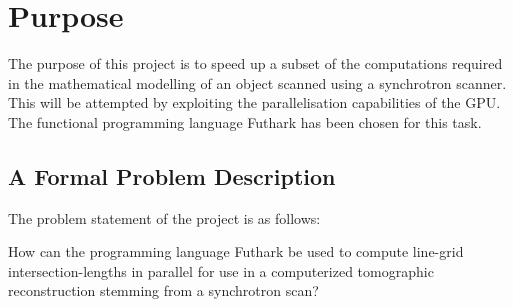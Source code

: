 \section{Purpose}
The purpose of this project is to speed up a subset of the computations required in the mathematical modelling of an object scanned using a synchrotron scanner. This will be attempted by exploiting the parallelisation capabilities of the GPU. The functional programming language Futhark has been chosen for this task.

\subsection{A Formal Problem Description}
The problem statement of the project is as follows:
\begin{center}
How can the programming language Futhark be used to compute line-grid intersection-lengths in parallel for use in a computerized tomographic reconstruction stemming from a synchrotron scan?
\end{center}